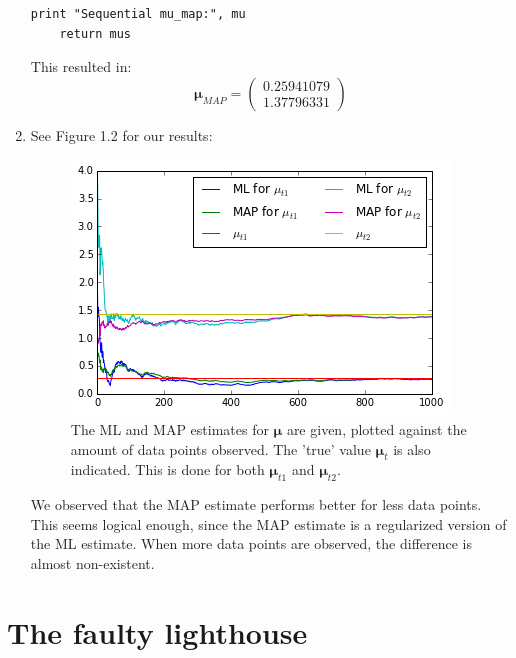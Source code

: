 \documentclass[a4paper,10pt]{article}
\numberwithin{equation}{section} %
\numberwithin{figure}{section} %
\numberwithin{table}{section} %
\theoremstyle{mytheor}
\begin{document}
\begin{enumerate}
\begin{lstlisting}[label={list:first},caption=Python code for function \textit{sequential\_learning\_map(data, mu\_p, sigma\_p, sigma\_t)}.]
    print "Sequential mu_map:", mu
    return mus
    		\end{lstlisting}
    		This resulted in:
    		\begin{equation}
    		\boldsymbol \mu_{MAP} = \begin{pmatrix} 0.25941079 \\ 1.37796331 \end{pmatrix}
    		\end{equation}
	\item See Figure 1.2 for our results: \begin{figure}[h!]
   			\centering
   			\includegraphics{mu.png}\vspace{-0.2cm}
   			\caption{\vspace{-0.2cm} The ML and MAP estimates for $\boldsymbol \mu$ are given, plotted against the amount of data points observed. The 'true' value $\boldsymbol \mu_t$ is also indicated. This is done for both $\boldsymbol \mu_{t1}$ and $\boldsymbol \mu_{t2}$. }
  		\end{figure}
  		We observed that the MAP estimate performs better for less data points. This seems logical enough, since the MAP estimate is a regularized version of the ML estimate. When more data points are observed, the difference is almost non-existent.
\end{enumerate}

\vfill

\section{The faulty lighthouse}
\end{document}
